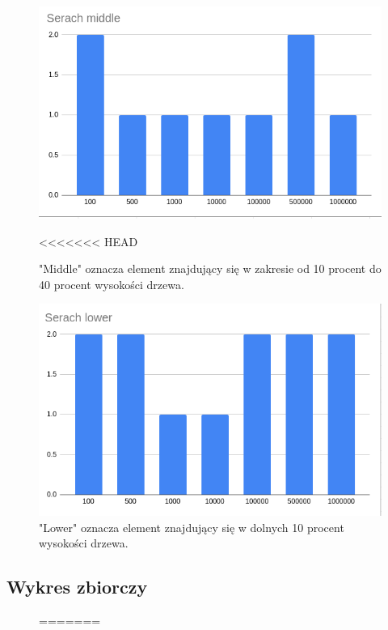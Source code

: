 \documentclass{article}
\begin{document}
\begin{figure}[H]
    \centering
    \includegraphics[width=\textwidth]{"../assets/4_4.png"}
    \caption{"Middle" oznacza element znajdujący się w zakresie od 10 procent do 40 procent wysokości drzewa. }
    \label{fig:4_4}
<<<<<<< HEAD
\end{figure}

\begin{figure}[H]
    \centering
    \includegraphics[width=\textwidth]{"../assets/4_5.png"}
    \caption{"Lower" oznacza element znajdujący się w dolnych 10 procent wysokości drzewa.}
    \label{fig:4_5}

\end{figure}

\subsection*{Wykres zbiorczy}

\begin{figure}[H]
    \centering
=======
\end{figure}
\end{document}
